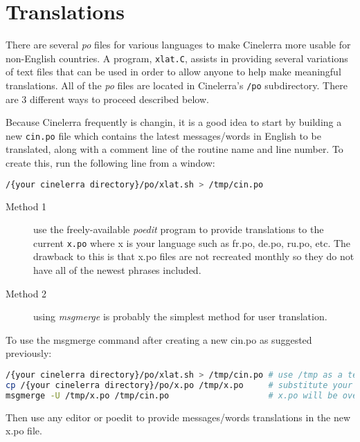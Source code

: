 \chapter{Translations}%
\label{cha:translations}

There are several \textit{po} files for various languages to make Cinelerra more usable for non-English countries.  A program, \texttt{xlat.C}, assists in providing several variations of text files that can be used in order to allow anyone to help make meaningful translations.  All of the \textit{po} files are located in Cinelerra’s \texttt{/po} subdirectory. There are 3 different ways to proceed described below.

Because Cinelerra frequently is changin, it is a good idea to start by building a new \texttt{cin.po} file which contains the latest messages/words in English to be translated, along with a comment line of the routine name and line number.  To create this, run the following line from a window:

\begin{lstlisting}[language=bash]
/{your cinelerra directory}/po/xlat.sh > /tmp/cin.po
\end{lstlisting}

\begin{description}
	\item[Method 1]  use the freely-available \textit{poedit} program to provide translations to the current \texttt{x.po} where x is your language such as fr.po, de.po, ru.po, etc.  The drawback to this is that x.po files are not recreated monthly so they do not have all of the newest phrases included.
	\item[Method 2] using \textit{msgmerge} is probably the simplest method for user translation.
\end{description}

To use the msgmerge command after creating a new cin.po as suggested previously:

\begin{lstlisting}[language=bash]
/{your cinelerra directory}/po/xlat.sh > /tmp/cin.po # use /tmp as a temporary place
cp /{your cinelerra directory}/po/x.po /tmp/x.po     # substitute your language for x
msgmerge -U /tmp/x.po /tmp/cin.po                    # x.po will be overwritten to include updates
\end{lstlisting}

Then use any editor or poedit to provide messages/words translations in the new x.po file.


